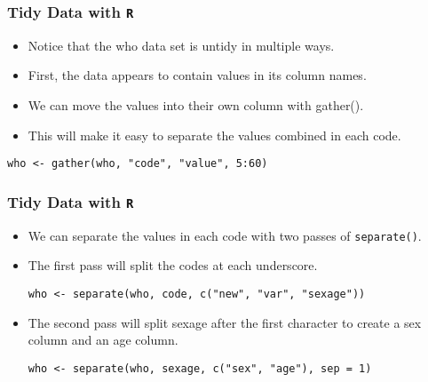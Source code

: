 \documentclass[TIDYMASTER.tex]{subfiles}
\begin{document}
\begin{frame}[fragile]
\frametitle{Tidy Data with \texttt{R}}
\Large
\begin{itemize}
\item Notice that the who data set is untidy in multiple ways.
\item  First, the data appears to contain values in its column names. 
\item We can move the values into their own column with gather(). 
\item This will make it easy to separate the values combined in each code.
\end{itemize}


\begin{verbatim}
who <- gather(who, "code", "value", 5:60)
\end{verbatim}


\end{frame}
\begin{frame}[fragile]
\frametitle{Tidy Data with \texttt{R}}
\Large
\begin{itemize}
\item We can separate the values in each code with two passes of \texttt{separate()}. 
\item The first pass will split the codes at each underscore.

\begin{verbatim}
who <- separate(who, code, c("new", "var", "sexage"))
\end{verbatim}
\item The second pass will split sexage after the first character to create a sex column and an age column.

\begin{verbatim}
who <- separate(who, sexage, c("sex", "age"), sep = 1)
\end{verbatim}
\end{itemize}



\end{frame}
\end{document}
